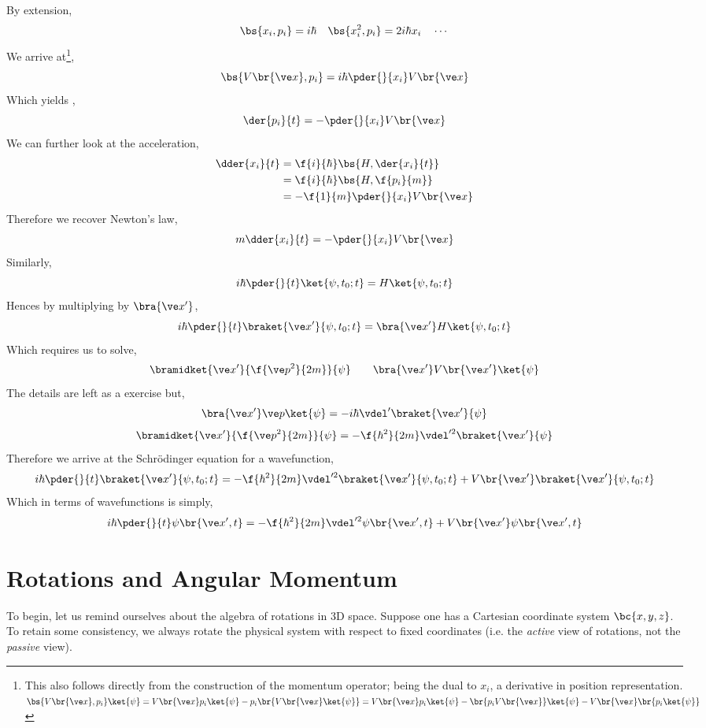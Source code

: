 \documentclass{article}
\begin{document}
By extension,
\[ \bs{x_i, p_i} = i\hbar \quad \bs{x_i^2, p_i} = 2i\hbar x_i \quad \cdots \]
We arrive at\footnote{This also follows directly from the construction of the momentum operator; being the dual to $x_i$, a derivative in position representation. $\bs{V\br{\ve x}, p_i}\ket{\psi} = V\br{\ve x} p_i \ket{\psi} -  p_i\br{V\br{\ve x} \ket{\psi}} = V\br{\ve x} p_i \ket{\psi} -  \br{p_iV\br{\ve x}} \ket{\psi} - V\br{\ve x} \br{p_i\ket{\psi}}$},
\[ \bs{V\br{\ve x}, p_i} = i \hbar \pder{}{x_i} V\br{\ve x} \]
Which yields ,
\[ \der{p_i}{t} = - \pder{}{x_i} V\br{\ve x} \]
We can further look at the acceleration,
\begin{align*}
    \dder{x_i}{t} &= \f{i}{\hbar}\bs{H, \der{x_i}{t}} \\
    &= \f{i}{\hbar}\bs{H, \f{p_i}{m}} \\
    &= -\f{1}{m} \pder{}{x_i} V\br{\ve x}
\end{align*}
Therefore we recover Newton's law,
\[ m \dder{x_i}{t} = - \pder{}{x_i} V\br{\ve x} \]
Similarly,
\[ i \hbar \pder{}{t} \ket{\psi, t_0;t} = H\ket{\psi, t_0;t} \]
Hences by multiplying by $\bra{\ve x'}$,
\[ i \hbar \pder{}{t} \braket{\ve x'}{\psi, t_0;t} =\bra{\ve x'} H\ket{\psi, t_0;t} \]
Which requires us to solve,
\[ \bramidket{\ve x'}{\f{\ve p^2}{2m}}{\psi} \qquad \bra{\ve x'} V\br{\ve x'} \ket{\psi} \]
The details are left as a exercise but,
\[ \bra{\ve x'} \ve p \ket{\psi} = - i \hbar \vdel' \braket{\ve x'}{\psi} \]
\[ \bramidket{\ve x'}{\f{\ve p^2}{2m}}{\psi} = -\f{\hbar^2}{2m} \vdel'^2 \braket{\ve x'}{\psi} \]
Therefore we arrive at the Schrödinger equation for a wavefunction,
\[ i \hbar \pder{}{t} \braket{\ve x'}{\psi, t_0;t} = -\f{\hbar^2}{2m} \vdel'^2\braket{\ve x'}{\psi, t_0;t} + V\br{\ve x'} \braket{\ve x'}{\psi, t_0; t}\]
Which in terms of wavefunctions is simply,
\[ i \hbar \pder{}{t} \psi\br{\ve x', t} = -\f{\hbar^2}{2m} \vdel'^2\psi\br{\ve x', t} + V\br{\ve x'} \psi\br{\ve x', t}\]
\section{Rotations and Angular Momentum}
To begin, let us remind ourselves about the algebra of rotations in 3D space. Suppose one has a Cartesian coordinate system $\bc{x,y,z}$. To retain some consistency, we always rotate the physical system with respect to fixed coordinates (i.e. the \textit{active} view of rotations, not the \textit{passive} view). \\
\end{document}
